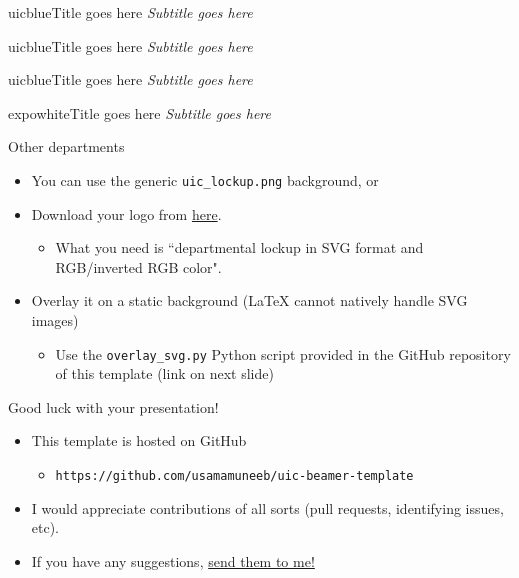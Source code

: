\documentclass{beamer}
\newcommand{\hrefcol}[2]{\textcolor{uihteal}{\href{#1}{#2}}}
\begin{document}
\begin{chapter}{uicblue}{Title goes here}
\textit{Subtitle goes here}
\end{chapter}

\begin{chapter}{uicblue}{Title goes here}
\textit{Subtitle goes here}
\end{chapter}

\begin{chapter}{uicblue}{Title goes here}
\textit{Subtitle goes here}
\end{chapter}

\begin{chapter}{expowhite}{Title goes here}
\textit{Subtitle goes here}
\end{chapter}

\begin{frame}[fragile]{Other departments}
\begin{itemize}
\item You can use the generic \texttt{uic\_lockup.png} background, or
\item Download your logo from \hrefcol{https://marketing.uic.edu/marketing-toolbox/university-style-guide/university-marks-logos/}{here}.
    \begin{itemize}
    \item What you need is ``departmental lockup in SVG format and RGB/inverted RGB color".
    \end{itemize}
\item Overlay it on a static background (LaTeX cannot natively handle SVG images)
    \begin{itemize}
    \item Use the \texttt{overlay\_svg.py} Python script provided in the GitHub repository of this template (link on next slide)
    \end{itemize}
\end{itemize}
\end{frame}


\begin{frame}{Good luck with your presentation!}
\begin{itemize}
\item This template is hosted on GitHub
    \begin{itemize}
    \item  \texttt{https://github.com/usamamuneeb/uic-beamer-template}
    \end{itemize}
\item  I would appreciate contributions of all sorts (pull requests, identifying issues, etc).
\item  If you have any suggestions,
\hrefcol{mailto:umunee2@uic.edu}{send them to me!}
\end{itemize}
\end{frame}


\backmatter
\end{document}
